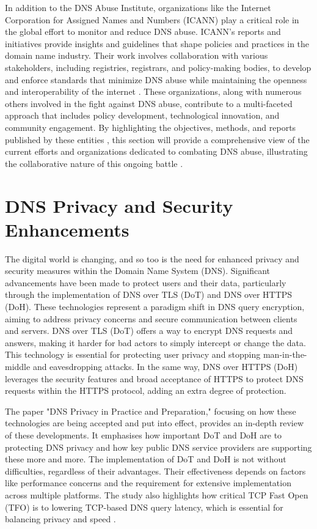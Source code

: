 In addition to the DNS Abuse Institute, organizations like the Internet Corporation for Assigned Names and Numbers (ICANN) play a critical role in the global effort to monitor and reduce DNS abuse. ICANN's reports and initiatives provide insights and guidelines that shape policies and practices in the domain name industry. Their work involves collaboration with various stakeholders, including registries, registrars, and policy-making bodies, to develop and enforce standards that minimize DNS abuse while maintaining the openness and interoperability of the internet \cite{icann2022dnsabuse} . These organizations, along with numerous others involved in the fight against DNS abuse, contribute to a multi-faceted approach that includes policy development, technological innovation, and community engagement.\cite{dnsabuseinstitute2023} By highlighting the objectives, methods, and reports published by these entities  \cite{dnsai2022report}   , this section will provide a comprehensive view of the current efforts and organizations dedicated to combating DNS abuse, illustrating the collaborative nature of this ongoing battle \cite{icann2022dnsabuse} .

\section{DNS Privacy and Security Enhancements}

The digital world is changing, and so too is the need for enhanced privacy and security measures within the Domain Name System (DNS). Significant advancements have been made to protect users and their data, particularly through the implementation of DNS over TLS (DoT) and DNS over HTTPS (DoH). These technologies represent a paradigm shift in DNS query encryption, aiming to address privacy concerns and secure communication between clients and servers. DNS over TLS (DoT) offers a way to encrypt DNS requests and answers, making it harder for bad actors to simply intercept or change the data. This technology is essential for protecting user privacy and stopping man-in-the-middle and eavesdropping attacks. In the same way, DNS over HTTPS (DoH) leverages the security features and broad acceptance of HTTPS to protect DNS requests within the HTTPS protocol, adding an extra degree of protection.

The paper "DNS Privacy in Practice and Preparation," focusing on how these technologies are being accepted and put into effect, provides an in-depth review of these developments. It emphasises how important DoT and DoH are to protecting DNS privacy and how key public DNS service providers are supporting these more and more. The implementation of DoT and DoH is not without difficulties, regardless of their advantages. Their effectiveness depends on factors like performance concerns and the requirement for extensive implementation across multiple platforms. The study also highlights how critical TCP Fast Open (TFO) is to lowering TCP-based DNS query latency, which is essential for balancing privacy and speed  \cite{acm2023dnsprivacy}  .


